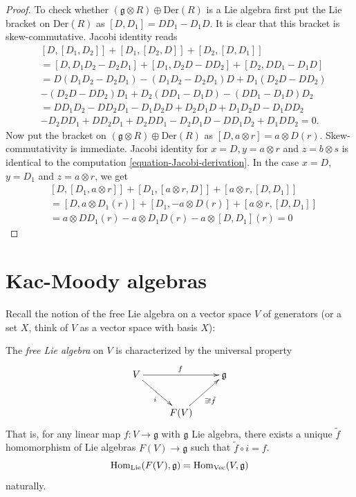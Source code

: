 \begin{proof}
\medskip\noindent
To check whether $(\mathfrak{g}\otimes
R)\oplus\text{Der}(R)$ is a Lie algebra
first put the Lie bracket on $\text{Der}(R)$
as
$[D,D_1]=DD_1-D_1D$. It is clear that this
bracket is skew-commutative.
Jacobi identity reads
$$
\begin{aligned}
&[D,[D_1,D_2]]+[D_1,[D_2,D]]+[D_2,[D,D_1]]\\
&=[D,D_1D_2-D_2D_1]+[D_1,D_2D-DD_2]+[D_2,
DD_1-D_1D]\\
&=D(D_1D_2-D_2D_1)-(D_1D_2-D_2D_1)D+D_1(D_2D-
DD_2)\\
&-(D_2D-DD_2)D_1+D_2(DD_1-D_1D)-(DD_1-D_1D)
D_2\\
&=DD_1D_2-DD_2D_1-D_1D_2D+D_2D_1D+D_1D_2D-
D_1DD_2\\
&-D_2DD_1+DD_2D_1+D_2DD_1-D_2D_1D-DD_1D_2+
D_1DD_2=0.
\end{aligned}
$$
Now put the bracket on $(\mathfrak{g} \otimes
R)\oplus\text{Der}(R)$ as
$[D,a \otimes  r]=a \otimes D(r)$.
Skew-commutativity is immediate.
Jacobi identity for $x=D,y=a\otimes r$ and
$z=b\otimes s$ is identical to the
computation \ref{equation-Jacobi-derivation}.
In the case
$x=D$, $y=D_1$ and $z=a\otimes r$, we get
$$
\begin{aligned}
&[D,[D_1,a\otimes r]]+[D_1,[a\otimes
r,D]]+[a\otimes r,[D,D_1]]\\
&=[D,a\otimes D_1(r)]+[D_1,-a\otimes
D(r)]+[a\otimes r,[D,D_1]]\\
&=a\otimes DD_1(r)-a\otimes D_1D(r)-a\otimes
[D,D_1](r)=0
\end{aligned}
$$
\end{proof}

\section{Kac-Moody algebras}
\label{section-Kac-Moody-algebras}

Recall the notion of the free Lie algebra on
a
vector space $V$ of generators
(or a set $X$, think of $V$ as a vector space
with basis $X$):

\begin{definition}
\label{definition-free-Lie-algebra}
The {\it free Lie algebra} on $V$ is
characterized by the universal property
$$
\xymatrix{
V\ar[rr]^f\ar[dr]_i&&\mathfrak{g}\\
& F(V)\ar[ur]_{\exists !\tilde{f}}
}
$$
That is, for any linear map $f:V \to
\mathfrak{g}$ with $\mathfrak{g}$ Lie
algebra, there exists a unique $\tilde{f}$
homomorphism of Lie algebras
$F(V)\to \mathfrak{g}$ such that $\tilde{f}
\circ i=f$.
$$
\mathop{\mathrm{Hom}}\nolimits_{\text{Lie}}(F(V),\mathfrak{g})=
\mathop{\mathrm{Hom}}\nolimits_{\text{Vec}}(V,\mathfrak{g})
$$
naturally.
\end{definition}

